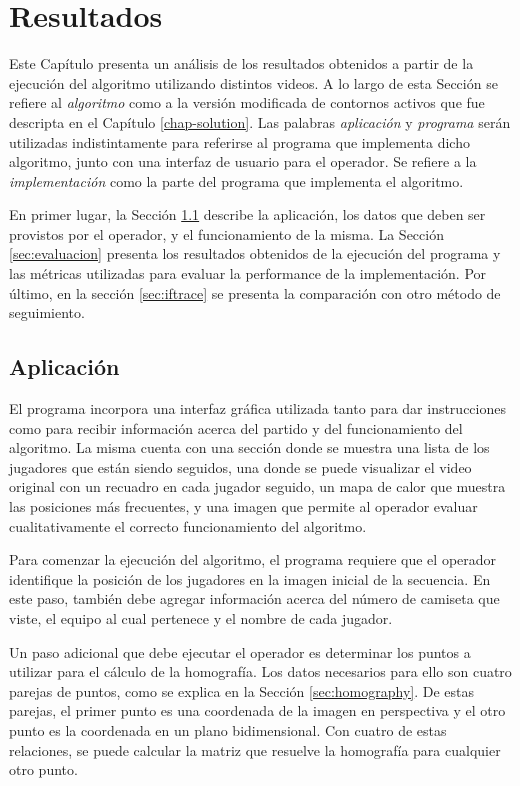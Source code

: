 \chapter{Resultados}
\label{chap-results}

Este Capítulo presenta un análisis de los resultados obtenidos a partir de la
ejecución del algoritmo utilizando distintos videos. A lo largo de esta Sección
se refiere al \textit{algoritmo} como a la versión modificada de contornos
activos que fue descripta en el Capítulo \ref{chap-solution}. Las palabras
\textit{aplicación} y \textit{programa} serán utilizadas indistintamente para
referirse al programa que implementa dicho algoritmo, junto con una interfaz de
usuario para el operador. Se refiere a la \textit{implementación} como la parte
del programa que implementa el algoritmo.

En primer lugar, la Sección \ref{sec:aplicacion} describe la aplicación, los
datos que deben ser provistos por el operador, y el funcionamiento de la misma.
La Sección \ref{sec:evaluacion} presenta los resultados obtenidos de la
ejecución del programa y las métricas utilizadas para evaluar la performance de
la implementación. Por último, en la sección \ref{sec:iftrace} se presenta la
comparación con otro método de seguimiento. 

\section{Aplicación}
\label{sec:aplicacion}

El programa incorpora una interfaz gráfica utilizada tanto para dar
instrucciones como para recibir información acerca del partido y del
funcionamiento del algoritmo. La misma cuenta con una sección donde se muestra
una lista de los jugadores que están siendo seguidos, una donde se puede
visualizar el video original con un recuadro en cada jugador seguido, un mapa de
calor que muestra las posiciones más frecuentes, y una imagen que permite al
operador evaluar cualitativamente el correcto funcionamiento del algoritmo.

Para comenzar la ejecución del algoritmo, el programa requiere que el operador
identifique la posición de los jugadores en la imagen inicial de la secuencia.
En este paso, también debe agregar información acerca del número de camiseta
que viste, el equipo al cual pertenece y el nombre de cada jugador.

Un paso adicional que debe ejecutar el operador es determinar los puntos a
utilizar para el cálculo de la homografía. Los datos necesarios para ello son
cuatro parejas de puntos, como se explica en la Sección \ref{sec:homography}. De
estas parejas, el primer punto es una coordenada de la imagen en perspectiva y
el otro punto es la coordenada en un plano bidimensional. Con cuatro de estas
relaciones, se puede calcular la matriz que resuelve la homografía para
cualquier otro punto.

